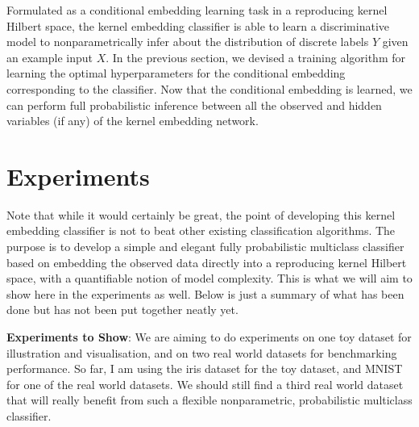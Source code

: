 \documentclass{article}
\newcommand{\note}[1]{{\color{orange} #1}}
\begin{document}
	Formulated as a conditional embedding learning task in a reproducing kernel Hilbert space, the kernel embedding classifier is able to learn a discriminative model to nonparametrically infer about the distribution of discrete labels $Y$ given an example input $X$. In the previous section, we devised a training algorithm for learning the optimal hyperparameters for the conditional embedding corresponding to the classifier. Now that the conditional embedding is learned, we can perform full probabilistic inference between all the observed and hidden variables (if any) of the kernel embedding network.
	
	

\section{Experiments}

	\note{Note that while it would certainly be great, the point of developing this kernel embedding classifier is not to beat other existing classification algorithms. The purpose is to develop a simple and elegant fully probabilistic multiclass classifier based on embedding the observed data directly into a reproducing kernel Hilbert space, with a quantifiable notion of model complexity. This is what we will aim to show here in the experiments as well. Below is just a summary of what has been done but has not been put together neatly yet.}
	
	\textbf{Experiments to Show}: We are aiming to do experiments on one toy dataset for illustration and visualisation, and on two real world datasets for benchmarking performance. So far, I am using the iris dataset for the toy dataset, and MNIST for one of the real world datasets. We should still find a third real world dataset that will really benefit from such a flexible nonparametric, probabilistic multiclass classifier.
	
\end{document}
